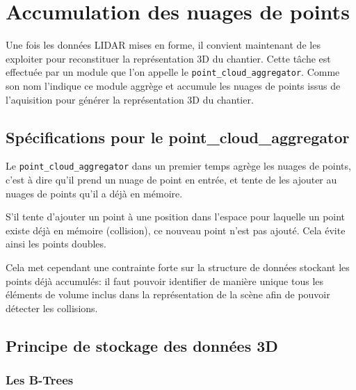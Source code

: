 \documentclass[12pt,a4paper]{report}
\begin{document}

		
	\section{Accumulation des nuages de points}
	
	Une fois les données LIDAR mises en forme, il convient maintenant de les exploiter pour reconstituer la représentation 3D du chantier. Cette tâche est effectuée par un module que l'on appelle le \verb|point_cloud_aggregator|. Comme son nom l'indique ce module aggrège et accumule les nuages de points issus de l'aquisition pour générer la représentation 3D du chantier.
	
		\subsection{Spécifications pour le point\_cloud\_aggregator}
		Le \verb|point_cloud_aggregator| dans un premier temps agrège les nuages de points, c'est à dire qu'il prend un nuage de point en entrée, et tente de les ajouter au nuages de points qu'il a déjà en mémoire. 
		
		\para S'il tente d'ajouter un point à une position dans l'espace pour laquelle un point existe déjà en mémoire (collision), ce nouveau point n'est pas ajouté. Cela évite ainsi les points doubles.
		
		\para Cela met cependant une contrainte forte sur la structure de données stockant les points déjà accumulés: il faut pouvoir identifier de manière unique tous les éléments de volume inclus dans la représentation de la scène afin de pouvoir détecter les collisions.
		
		\cite{shekhar_encyclopedia_2017}
		
		\subsection{Principe de stockage des données 3D}
		
		\subsubsection{Les B-Trees}
		
\end{document}
